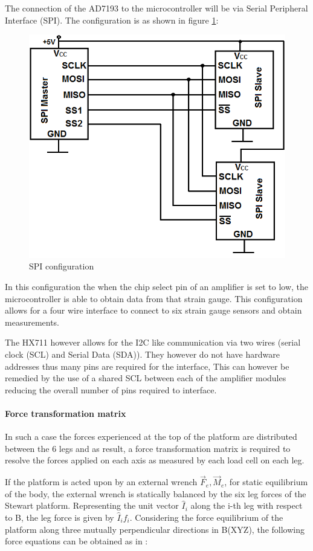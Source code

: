 The connection of the AD7193 to the microcontroller will be via Serial Peripheral Interface (SPI). The configuration is as shown in figure \ref{spi}:
\begin{center}
\begin{figure}[H]
\centering
\includegraphics[width=0.55\linewidth]{Figures/SPI}
\caption[SPI configuration]{SPI configuration}
\label{spi}
\end{figure}
\end{center}
In this configuration the when the chip select pin of an amplifier is set to low, the microcontroller is able to obtain data from that strain gauge. This configuration allows for a four wire interface to connect to six strain gauge sensors and obtain measurements.

The HX711 however allows for the I2C like communication via two wires (serial clock (SCL) and Serial Data (SDA)). They however do not have hardware addresses thus many pins are required for the interface, This can however be remedied by the use of a shared SCL between each of the amplifier modules reducing the overall number of pins required to interface.

\paragraph{Force transformation matrix} 
In such a case the forces experienced at the top of the platform are distributed between the 6 legs and as result, a force transformation matrix is required to resolve the forces applied on each axis as measured by each load cell on each leg. 

If the platform is acted upon by an external wrench {$\vec{F}_e, \vec{M}_e$}, for static equilibrium of the body, the external wrench is statically balanced by the six leg forces of the Stewart platform. Representing the unit vector $\hat{I}_i$ along the i-th leg with respect to B, the leg force is given  by $\hat{I}_if_i$. Considering the force equilibrium of the platform along  three mutually perpendicular directions in B(XYZ), the following force equations can be obtained as in \cite{dwarakanath_design_2001}:

